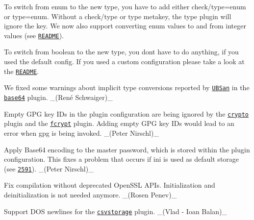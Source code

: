 To switch from {\ttfamily enum} to the new {\ttfamily type}, you have to add either {\ttfamily check/type=enum} or {\ttfamily type=enum}. Without a {\ttfamily check/type} or {\ttfamily type} metakey, the {\ttfamily type} plugin will ignore the key. We now also support converting enum values to and from integer values (see \href{https://www.libelektra.org/plugins/type}{\tt R\+E\+A\+D\+ME}).

To switch from {\ttfamily boolean} to the new {\ttfamily type}, you don\textquotesingle{}t have to do anything, if you used the default config. If you used a custom configuration please take a look at the \href{https://www.libelektra.org/plugins/type}{\tt R\+E\+A\+D\+ME}.


\begin{DoxyItemize}
\item We fixed some warnings about implicit type conversions reported by \href{https://clang.llvm.org/docs/UndefinedBehaviorSanitizer.html}{\tt U\+B\+San} in the \href{https://www.libelektra.org/plugins/base64}{\tt base64} plugin. \+\_\+(René Schwaiger)\+\_\+
\end{DoxyItemize}


\begin{DoxyItemize}
\item Empty G\+PG key I\+Ds in the plugin configuration are being ignored by the \href{https://www.libelektra.org/plugins/crypto}{\tt crypto} plugin and the \href{https://www.libelektra.org/plugins/fcrypt}{\tt fcrypt} plugin. Adding empty G\+PG key I\+Ds would lead to an error when {\ttfamily gpg} is being invoked. \+\_\+(\+Peter Nirschl)\+\_\+
\item Apply Base64 encoding to the master password, which is stored within the plugin configuration. This fixes a problem that occurs if ini is used as default storage (see \href{https://github.com/ElektraInitiative/libelektra/issues/2591}{\tt 2591}). \+\_\+(\+Peter Nirschl)\+\_\+
\item Fix compilation without deprecated Open\+S\+SL A\+P\+Is. Initialization and deinitialization is not needed anymore. \+\_\+(\+Rosen Penev)\+\_\+
\end{DoxyItemize}


\begin{DoxyItemize}
\item Support D\+OS newlines for the \href{https://www.libelektra.org/plugins/csvstorage}{\tt csvstorage} plugin. \+\_\+(Vlad -\/ Ioan Balan)\+\_\+
\end{DoxyItemize}


